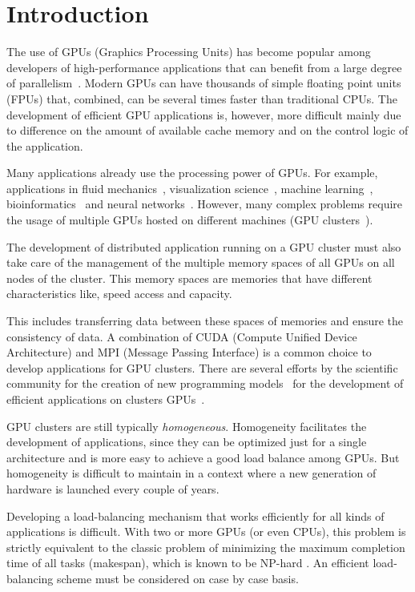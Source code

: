 \documentclass[journal]{IEEEtran}
\begin{document}
\section{Introduction}

The use of GPUs (Graphics Processing Units) has become popular among
developers of high-performance applications that can benefit from a
large degree of parallelism~\cite{gpu2}. Modern GPUs can have
thousands of simple floating point units (FPUs) that, combined, can be
several times faster than traditional CPUs. The development of efficient GPU
applications is, however, more difficult mainly due to difference on
the amount of available cache memory and on the control logic of the
application.


Many applications already use the processing power of GPUs. For example,
applications in fluid mechanics~\cite{fluid2}, visualization science~\cite{visualization2},
machine learning~\cite{learning2}, bioinformatics~\cite{bioinformatica2} and neural networks~\cite{neural}. However, many complex
problems require the usage of multiple GPUs hosted on different machines (GPU clusters~\cite{raphael, cluster}).


The development of distributed application running on a GPU cluster must also take care of the management of the multiple memory spaces of all GPUs on all nodes of the cluster. This memory spaces are memories that have different characteristics like, speed access and capacity. 

This includes transferring data between these spaces of memories and
ensure the consistency of data. A combination of CUDA (Compute Unified Device
Architecture) and MPI (Message Passing Interface) is a common choice to develop
applications for GPU clusters. There are several efforts by the scientific community for
the creation of new programming models~\cite{appCientificas, wave} for the
development of efficient applications on clusters GPUs~\cite{snucl, Flat, starpu}.

GPU clusters are still typically \emph{homogeneous}. Homogeneity facilitates the development of
applications, since they can be optimized just for a single architecture and is more easy to achieve a good load balance among GPUs. But homogeneity is difficult to maintain in a context
where a new generation of hardware is launched every couple of years.

Developing a load-balancing mechanism that works efficiently for all kinds of applications
is difficult. With two or more GPUs (or even CPUs), this problem is strictly equivalent to the
classic problem of minimizing the maximum completion time of all tasks
(makespan), which is known to be NP-hard \cite{GaJo1979}. An efficient load-balancing scheme must be considered on case by case basis.
\end{document}
